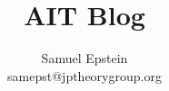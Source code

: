 \documentclass[11pt]{article}\textwidth 6.5in\textheight 9in
\begin{document}
\newcommand\w{{\mathbf w}}
\newcommand\Cs{\mathbf{Cs}} \newcommand\q{{\mathbf q}}
\newcommand\E{{\mathbf E}} \newcommand\St{{\mathbf S}}
\newcommand\M{{\mathbf M}}\newcommand\Q{{\mathbf Q}}
\newcommand\ch{{\mathcal H}} \renewcommand\l{\tau}
\newcommand\tb{{\mathbf t}} \renewcommand\L{{\mathbf L}}
\newcommand\bb{{\mathbf {bb}}}\newcommand\Km{{\mathbf {Km}}}
\renewcommand\q{{\mathbf q}}\newcommand\J{{\mathbf J}}
\newcommand\z{\mathbf{z}}

\newcommand\B{\mathbf{bb}}\newcommand\f{\mathbf{f}}
\newcommand\hd{\mathbf{0'}} \newcommand\T{{\mathbf T}}
\newcommand\R{\mathbb{R}}\renewcommand\Q{\mathbb{Q}}
\newcommand\N{\mathbb{N}}\newcommand\BT{\{0,1\}}
\newcommand\FS{\BT^*}\newcommand\IS{\BT^\infty}
\newcommand\FIS{\BT^{*\infty}}
\renewcommand\S{\mathcal{C}}\newcommand\ST{\mathcal{S}}
\newcommand\UM{\nu_0}\newcommand\EN{\mathcal{W}}

\newcommand{\supp}{\mathrm{Supp}}

\newcommand\lenum{\lbrack\!\lbrack}
\newcommand\renum{\rbrack\!\rbrack}

\newcommand\h{\mathbf{h}}
\renewcommand\qed{\hfill\emm\square}
\renewcommand\i{\mathbf{i}}
\newcommand\p{\mathbf{p}}
\renewcommand\q{\mathbf{q}}
\title{ AIT Blog}

\author {Samuel Epstein\\samepst@jptheorygroup.org}

\maketitle
\end{document}
